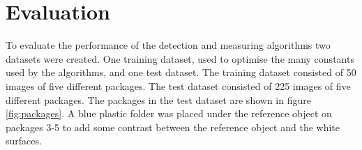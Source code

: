 \section{Evaluation} %
To evaluate the performance of the detection and measuring algorithms two datasets were created.
One training dataset, used to optimise the many constants used by the algorithms, and one test dataset. %
The training dataset consisted of 50 images of five different packages.
The test dataset consisted of 225 images of five different packages.
The packages in the test dataset are shown in figure \ref{fig:packages}. A blue plastic folder was placed under the reference object on packages 3-5 to add some contrast between the reference object and the white surfaces.

